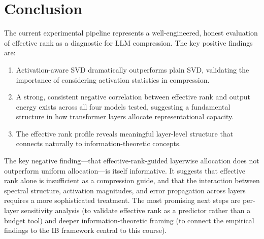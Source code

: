 \documentclass[11pt]{article}
\begin{document}
\section{Conclusion}

The current experimental pipeline represents a well-engineered, honest evaluation of effective rank as a diagnostic for LLM compression.  The key positive findings are:
\begin{enumerate}
    \item Activation-aware SVD dramatically outperforms plain SVD, validating the importance of considering activation statistics in compression.
    \item A strong, consistent negative correlation between effective rank and output energy exists across all four models tested, suggesting a fundamental structure in how transformer layers allocate representational capacity.
    \item The effective rank profile reveals meaningful layer-level structure that connects naturally to information-theoretic concepts.
\end{enumerate}

The key negative finding---that effective-rank-guided layerwise allocation does not outperform uniform allocation---is itself informative.  It suggests that effective rank alone is insufficient as a compression guide, and that the interaction between spectral structure, activation magnitudes, and error propagation across layers requires a more sophisticated treatment.  The most promising next steps are per-layer sensitivity analysis (to validate effective rank as a predictor rather than a budget tool) and deeper information-theoretic framing (to connect the empirical findings to the IB framework central to this course).
\end{document}
